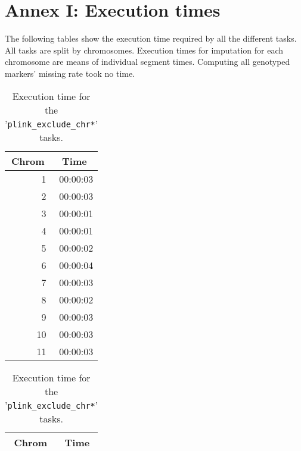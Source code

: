 \documentclass[10pt,twoside,english]{scrartcl}
\begin{document}

%


\clearpage

%
\section*{Annex I: Execution times}\label{sec:execution_time}

The following tables show the execution time required by all the
different tasks. All tasks are split by chromosomes. Execution times
for imputation for each chromosome are means of individual segment
times. Computing all genotyped markers' missing rate took no time.


\begin{table}[H]
\protect\caption{Execution time for the '\texttt{plink\_exclude\_chr*}' tasks.\label{tab:plink_exclude_exec_time}}

\centering

\begin{tabular}{rr}
\hline 
\multicolumn{1}{c}{\textbf{Chrom}}
 & \multicolumn{1}{c}{\textbf{Time}}
\\
\hline 

1 & {\color{light_gray}00:00:0}3\\
2 & {\color{light_gray}00:00:0}3\\
3 & {\color{light_gray}00:00:0}1\\
4 & {\color{light_gray}00:00:0}1\\
5 & {\color{light_gray}00:00:0}2\\
6 & {\color{light_gray}00:00:0}4\\
7 & {\color{light_gray}00:00:0}3\\
8 & {\color{light_gray}00:00:0}2\\
9 & {\color{light_gray}00:00:0}3\\
10 & {\color{light_gray}00:00:0}3\\
11 & {\color{light_gray}00:00:0}3\\
\hline 
\end{tabular}
\hspace{1cm}
\begin{tabular}{rr}
\hline 
\multicolumn{1}{c}{\textbf{Chrom}}
 & \multicolumn{1}{c}{\textbf{Time}}
\\
\hline 


\end{tabular}
\end{table}
\end{document}

